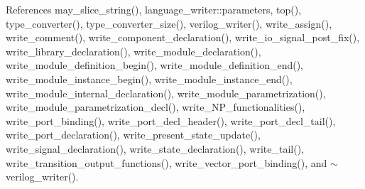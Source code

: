 References may\+\_\+slice\+\_\+string(), language\+\_\+writer\+::parameters, top(), type\+\_\+converter(), type\+\_\+converter\+\_\+size(), verilog\+\_\+writer(), write\+\_\+assign(), write\+\_\+comment(), write\+\_\+component\+\_\+declaration(), write\+\_\+io\+\_\+signal\+\_\+post\+\_\+fix(), write\+\_\+library\+\_\+declaration(), write\+\_\+module\+\_\+declaration(), write\+\_\+module\+\_\+definition\+\_\+begin(), write\+\_\+module\+\_\+definition\+\_\+end(), write\+\_\+module\+\_\+instance\+\_\+begin(), write\+\_\+module\+\_\+instance\+\_\+end(), write\+\_\+module\+\_\+internal\+\_\+declaration(), write\+\_\+module\+\_\+parametrization(), write\+\_\+module\+\_\+parametrization\+\_\+decl(), write\+\_\+\+N\+P\+\_\+functionalities(), write\+\_\+port\+\_\+binding(), write\+\_\+port\+\_\+decl\+\_\+header(), write\+\_\+port\+\_\+decl\+\_\+tail(), write\+\_\+port\+\_\+declaration(), write\+\_\+present\+\_\+state\+\_\+update(), write\+\_\+signal\+\_\+declaration(), write\+\_\+state\+\_\+declaration(), write\+\_\+tail(), write\+\_\+transition\+\_\+output\+\_\+functions(), write\+\_\+vector\+\_\+port\+\_\+binding(), and $\sim$verilog\+\_\+writer().

